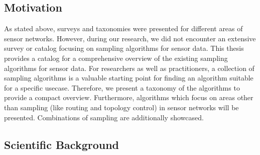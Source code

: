 
\subsection{Motivation}
\label{sec:motivation}

As stated above, surveys and taxonomies were presented for different areas of
sensor networks. However, during our research, we did not encounter an
extensive survey or catalog focusing on sampling algorithms for sensor data.
This thesis provides a catalog for a comprehensive overview of the existing
sampling algorithms for sensor data. For researchers as well as practitioners,
a collection of sampling algorithms is a valuable starting point for finding an
algorithm suitable for a specific usecase. Therefore, we present a taxonomy of
the algorithms to provide a compact overview. Furthermore, algorithms which
focus on areas other than sampling (like routing and topology control) in
sensor networks will be presented. Combinations of sampling are additionally
showcased.

\subsection{Scientific Background}
\label{sec:Scientific Background}

